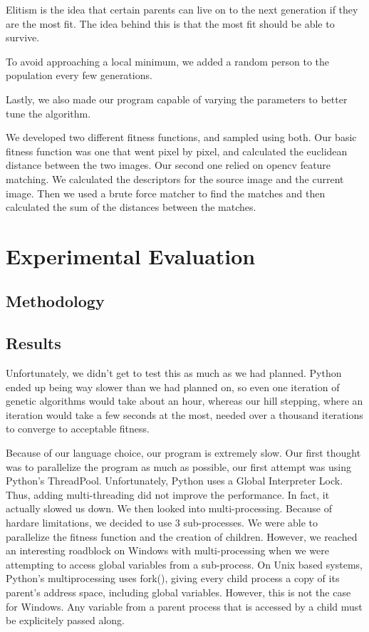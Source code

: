\documentclass[12pt,letterpaper]{article}
\begin{document}
Elitism is the idea that certain parents can live on to the next generation if they are the most fit.  The idea behind this is that the most fit should be able to survive.

To avoid approaching a local minimum, we added a random person to the population every few generations.

Lastly, we also made our program capable of varying the parameters to better tune the algorithm.

We developed two different fitness functions, and sampled using both. Our basic fitness function was one that went pixel by pixel, and calculated the euclidean distance between the two images. Our second one relied on opencv feature matching. We calculated the descriptors for the source image and the current image.  Then we used a brute force matcher to find the matches and then calculated the sum of the distances between the matches.

\section{Experimental Evaluation}

\subsection{Methodology}

\subsection{Results}
Unfortunately, we didn't get to test this as much as we had planned. Python ended up being way slower than we had planned on, so even one iteration of genetic algorithms would take about an hour, whereas our hill stepping, where an iteration would take a few seconds at the most, needed over a thousand iterations to converge to acceptable fitness.

Because of our language choice, our program is extremely slow.  Our first thought was to parallelize the program as much as possible, our first attempt was using Python's ThreadPool. Unfortunately, Python uses a Global Interpreter Lock.  Thus, adding multi-threading did not improve the performance.  In fact, it actually slowed us down.  We then looked into multi-processing. Because of hardare limitations, we decided to use 3 sub-processes.  We were able to parallelize the fitness function and the creation of children.  However, we reached an interesting roadblock on Windows with multi-processing when we were attempting to access global variables from a sub-process.  On Unix based systems, Python's multiprocessing uses fork(), giving every child process a copy of its parent's address space, including global variables.  However, this is not the case for Windows.  Any variable from a parent process that is accessed by a child must be explicitely passed along.
\end{document}
